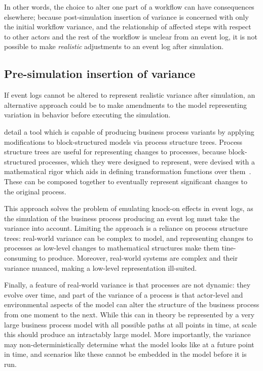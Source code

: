\documentclass[12pt]{llncs}  %
\begin{document}
In other words, the choice to alter one part of a workflow can have consequences
elsewhere; because post-simulation insertion of variance is concerned with only
the initial workflow variance, and the relationship of affected steps with
respect to other actors and the rest of the workflow is unclear from an event
log, it is not possible to make \emph{realistic} adjustments to an event log
after simulation.
\par


\subsection{Pre-simulation insertion of variance}
If event logs cannot be altered to represent realistic variance after
simulation, an alternative approach could be to make amendments to the model
representing variation in behavior before executing the simulation.
\par

\cite{pourmasoumi2015business} detail a tool which is capable of producing
business process variants by applying modifications to block-structured models
via process structure trees. Process structure trees are useful for representing
changes to processes, because block-structured processes, which they were
designed to represent, were devised with a mathematical rigor which aids in
defining transformation functions over them~\citep{li2010mining}. These can be composed together to
eventually represent significant changes to the original process.\par

This approach solves the problem of emulating knock-on effects in event logs, as
the simulation of the business process producing an event log must take the
variance into account. Limiting the approach is a reliance on process structure
trees: real-world variance can be complex to model, and representing changes to
processes as low-level changes to mathematical structures make them
tine-consuming to produce. Moreover, real-world systems are complex and their
variance nuanced, making a low-level representation ill-suited.
\par

Finally, a feature of real-world variance is that processes are not dynamic:
they evolve over time, and part of the variance of a process is that actor-level
and environmental aspects of the model can alter the structure of the business
process from one moment to the next. While this can in theory be represented by
a very large business process model with all possible paths at all points in
time, at scale this should produce an intractably large model. More importantly,
the variance may non-deterministically determine what the model looks like at a
future point in time, and scenarios like these cannot be embedded in the model
before it is run.
\par
\end{document}
